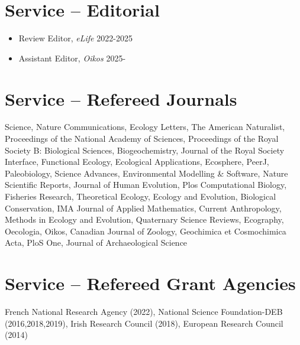 \documentclass[margin,line,12pt]{res}
\begin{document}
\begin{resume}
\begin{itemize}
\end{itemize}

\section{\sc Service -- Editorial}
\begin{itemize}
  \item Review Editor, \emph{eLife} \hfill 2022-2025
  \item Assistant Editor, \emph{Oikos} \hfill 2025-
\end{itemize}


\section{\sc Service -- Refereed Journals}
Science,
Nature Communications,
Ecology Letters,
The American Naturalist,
Proceedings of the National Academy of Sciences,
Proceedings of the Royal Society B: Biological Sciences,
Biogeochemistry,
Journal of the Royal Society Interface,
Functional Ecology,
Ecological Applications,
Ecosphere,
PeerJ,
Paleobiology,
Science Advances,
Environmental Modelling \& Software,
Nature Scientific Reports,
Journal of Human Evolution,
Plos Computational Biology,
Fisheries Research,
Theoretical Ecology,
Ecology and Evolution,
Biological Conservation,
IMA Journal of Applied Mathematics,
Current Anthropology,
Methods in Ecology and Evolution,
Quaternary Science Reviews,
Ecography,
Oecologia,
Oikos,
Canadian Journal of Zoology,
Geochimica et Cosmochimica Acta,
PloS One,
Journal of Archaeological Science

\section{\sc Service -- Refereed Grant Agencies}
French National Research Agency (2022),
National Science Foundation-DEB (2016,2018,2019),
Irish Research Council (2018),
European Research Council (2014)

\vspace{0.6cm}


\end{resume}
\end{document}
